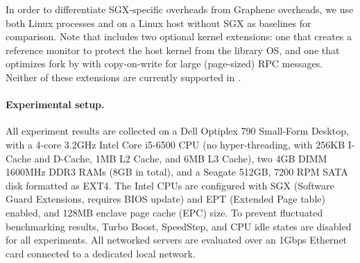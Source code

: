 
In order to differentiate SGX-specific overheads 
from Graphene overheads,
we use both
Linux processes and \graphene{} on a Linux host without SGX as baselines
for comparison.
Note that \graphene{} includes two optional kernel extensions:
one that creates a reference monitor to protect the host kernel from 
the library OS, and one that optimizes fork by 
with copy-on-write for large (page-sized) RPC messages.
Neither of these extensions are currently supported in \graphenesgx{}.



\paragraph{Experimental setup.}

All experiment results are collected on a Dell Optiplex 790 Small-Form Desktop,
with a 4-core 3.2GHz Intel Core i5-6500 CPU (no hyper-threading, with 256KB I-Cache and D-Cache, 1MB L2 Cache, and 6MB L3 Cache),
two 4GB DIMM 1600MHz DDR3 RAMs (8GB in total), and a Seagate 512GB, 7200 RPM SATA disk formatted as EXT4.
The Intel CPUs are configured with SGX (Software Guard Extensions, requires BIOS update) and EPT (Extended Page table) enabled, and 128MB enclave page cache (EPC) size.
To prevent fluctuated benchmarking results,
Turbo Boost, SpeedStep, and CPU idle states are disabled for
all experiments.
All networked servers are evaluated over an 1Gbps Ethernet card connected to a dedicated local network.




